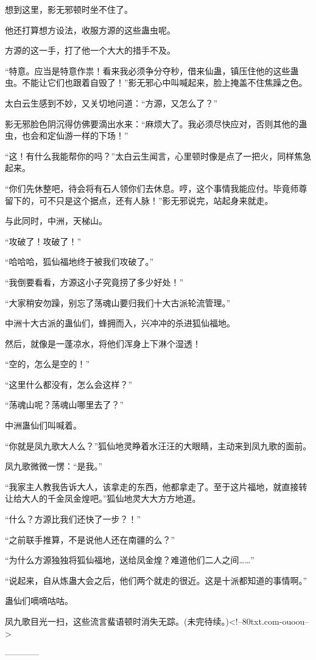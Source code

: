 \begin{this_body}
想到这里，影无邪顿时坐不住了。

他还打算想方设法，收服方源的这些蛊虫呢。

方源的这一手，打了他一个大大的措手不及。

“特意。应当是特意作祟！看来我必须争分夺秒，借来仙蛊，镇压住他的这些蛊虫。不能让它们也跟着自毁了！”影无邪心中叫喊起来，脸上掩盖不住焦躁之色。

太白云生感到不妙，又关切地问道：“方源，又怎么了？”

影无邪脸色阴沉得仿佛要滴出水来：“麻烦大了。我必须尽快应对，否则其他的蛊虫，也会和定仙游一样的下场！”

“这！有什么我能帮你的吗？”太白云生闻言，心里顿时像是点了一把火，同样焦急起来。

“你们先休整吧，待会将有石人领你们去休息。哼，这个事情我能应付。毕竟师尊留下的，可不只是这个据点，还有人脉！”影无邪说完，站起身来就走。

与此同时，中洲，天梯山。

“攻破了！攻破了！”

“哈哈哈，狐仙福地终于被我们攻破了。”

“我倒要看看，方源这小子究竟捞了多少好处！”

“大家稍安勿躁，别忘了荡魂山要归我们十大古派轮流管理。”

中洲十大古派的蛊仙们，蜂拥而入，兴冲冲的杀进狐仙福地。

然后，就像是一蓬凉水，将他们浑身上下淋个湿透！

“空的，怎么是空的！”

“这里什么都没有，怎么会这样？”

“荡魂山呢？荡魂山哪里去了？”

中洲蛊仙们叫喊着。

“你就是凤九歌大人么？”狐仙地灵睁着水汪汪的大眼睛，主动来到凤九歌的面前。

凤九歌微微一愣：“是我。”

“我家主人教我告诉大人，该拿走的东西，他都拿走了。至于这片福地，就直接转让给大人的千金凤金煌吧。”狐仙地灵大大方方地道。

“什么？方源比我们还快了一步？！”

“之前联手推算，不是说他人还在南疆的么？”

“为什么方源独独将狐仙福地，送给凤金煌？难道他们二人之间……”

“说起来，自从炼蛊大会之后，他们两个就走的很近。这是十派都知道的事情啊。”

蛊仙们嘀嘀咕咕。

凤九歌目光一扫，这些流言蜚语顿时消失无踪。(未完待续。)<!--80txt.com-ouoou-->

------------

\end{this_body}

